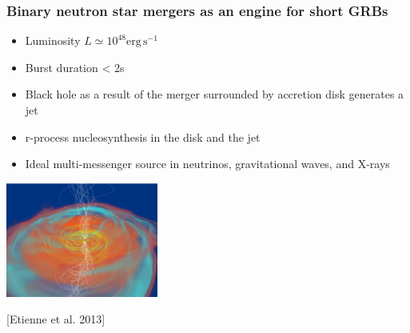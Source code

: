 \documentclass{beamer}
\begin{document}
\begin{frame}
\frametitle{Binary neutron star mergers as an engine for short GRBs}
\hspace{-0.5cm}
\begin{minipage}[]{0.5\textwidth}
\begin{itemize}
\item Luminosity $L \simeq 10^{48} \mathrm{erg\, s^{-1}}$
\item Burst duration < 2s
\item Black hole as a result of the merger surrounded by accretion disk generates a jet
\item r-process nucleosynthesis in the disk and the jet
\item Ideal multi-messenger source in neutrinos, gravitational waves, and X-rays
\end{itemize}
\end{minipage}
\hspace{0.5cm}
\begin{minipage}[]{0.4\textwidth}
\begin{minipage}[]{\textwidth}
\includegraphics[width=5.0cm]{./etienne.png}
\end{minipage}

\begin{minipage}[]{\textwidth}
\small [Etienne et al. 2013]
\end{minipage}
\end{minipage}

\end{frame}
\end{document}
